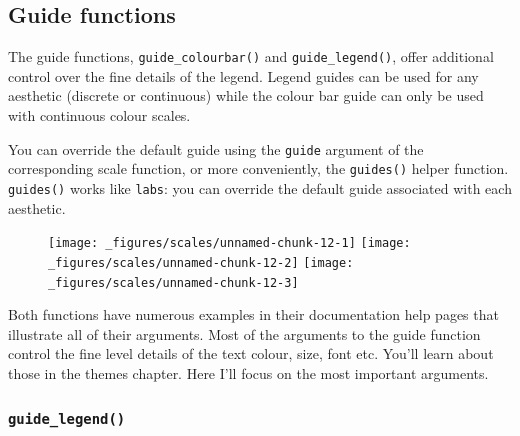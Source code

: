 \subsection{Guide functions}

The guide functions, \texttt{guide\_colourbar()} and
\texttt{guide\_legend()}, offer additional control over the fine details
of the legend. Legend guides can be used for any aesthetic (discrete or
continuous) while the colour bar guide can only be used with continuous
colour scales.

You can override the default guide using the \texttt{guide} argument of
the corresponding scale function, or more conveniently, the
\texttt{guides()} helper function. \texttt{guides()} works like
\texttt{labs}: you can override the default guide associated with each
aesthetic.

\begin{Shaded}
\begin{Highlighting}[]
\StringTok{ }\NormalTok{(} \NormalTok{, } \NormalTok{:}\NormalTok{, } \NormalTok{:}\NormalTok{)}
\StringTok{ }\StringTok{ }\NormalTok{(}\NormalTok{(} 
\StringTok{ }\NormalTok{(} \NormalTok{())}
\StringTok{ }\NormalTok{(} \NormalTok{())}
\end{Highlighting}
\end{Shaded}

\begin{figure}[H]
  \texttt{[image: \_figures/scales/unnamed-chunk-12-1]}%
  \texttt{[image: \_figures/scales/unnamed-chunk-12-2]}%
  \texttt{[image: \_figures/scales/unnamed-chunk-12-3]}
\end{figure}

Both functions have numerous examples in their documentation help pages
that illustrate all of their arguments. Most of the arguments to the
guide function control the fine level details of the text colour, size,
font etc. You'll learn about those in the themes chapter. Here I'll
focus on the most important arguments.

\subsubsection{\texttt{guide\_legend()}}

